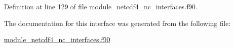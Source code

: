 Definition at line 129 of file module\+\_\+netcdf4\+\_\+nc\+\_\+interfaces.\+f90.



The documentation for this interface was generated from the following file\+:\begin{DoxyCompactItemize}
\item 
\hyperlink{module__netcdf4__nc__interfaces_8f90}{module\+\_\+netcdf4\+\_\+nc\+\_\+interfaces.\+f90}\end{DoxyCompactItemize}
